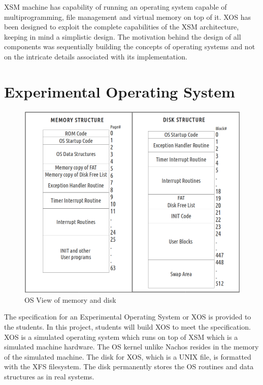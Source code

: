 \documentclass[10pt]{report}
\begin{document}
XSM machine has capability of running an operating system capable of multiprogramming, file management and virtual memory on top of it. XOS has been designed to exploit the complete capabilities of the XSM architecture, keeping in mind a simplistic design. The motivation behind the design of all components was sequentially building the concepts of operating systems and not on the intricate details associated with its implementation.




\section{Experimental Operating System }

\begin{figure}[hbtp]
\centering
\includegraphics[scale=0.35]{memdiskstructure.png}
\caption{OS View of memory and disk}
\end{figure}

The specification for an Experimental Operating System or XOS is provided to the students. In this project, students will build XOS to meet the specification. XOS is a simulated operating system which runs on top of XSM which is a simulated machine hardware. The OS kernel unlike Nachos \cite{nachos} resides in the memory of the simulated machine. The disk for XOS, which is a UNIX file,  is formatted with the XFS filesystem. The disk permanently stores the OS routines and data structures as in real systems.  \\
\end{document}
